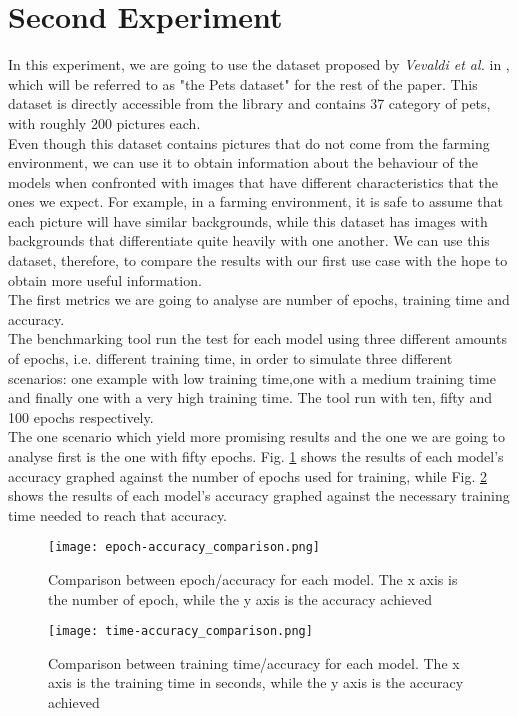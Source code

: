 \section{Second Experiment}
In this experiment, we are going to use the dataset proposed by \textit{Vevaldi et al.} in \cite{parkhi12a}, which will be referred to as "the Pets dataset" for the rest of the paper. This dataset is directly accessible from the library and contains 37 category of pets, with roughly 200 pictures each. \\
Even though this dataset contains pictures that do not come from the farming environment, we can use it to obtain information about the behaviour of the models when confronted with images that have different characteristics that the ones we expect. For example, in a farming environment, it is safe to assume that each picture will have similar backgrounds, while this dataset has images with backgrounds that differentiate quite heavily with one another. We can use this dataset, therefore, to compare the results with our first use case with the hope to obtain more useful information.\\
The first metrics we are going to analyse are number of epochs, training time and accuracy.\\
The benchmarking tool run the test for each model using three different amounts of epochs, i.e. different training time, in order to simulate three different scenarios: one example with low training time,one with a medium training time and finally one with a very high training time. The tool run with ten, fifty and 100 epochs respectively. \\
The one scenario which yield more promising results and the one we are going to analyse first is the one with fifty epochs. Fig. \ref{fig:com_ep_ac_models} shows the results of each model's accuracy graphed against the number of epochs used for training, while  Fig. \ref{fig:com_ti_ac_models} shows the results of each model's accuracy graphed against the necessary training time needed to reach that accuracy.\\




\begin{figure}[h]
       \centering 
	    \texttt{[image: epoch-accuracy\_comparison.png]}
        \caption[Comparison between epoch/accuracy for each model]{Comparison between epoch/accuracy for each model. The x axis is the number of epoch, while the y axis is the accuracy achieved}
         \label{fig:com_ep_ac_models}
     \end{figure}
\begin{figure}[h]
\centering 
	    \texttt{[image: time-accuracy\_comparison.png]}
        \caption[Comparison between training time/accuracy for each model]{Comparison between training time/accuracy for each model. The x axis is the training time in seconds, while the y axis is the accuracy achieved}
        \label{fig:com_ti_ac_models}
\end{figure}



